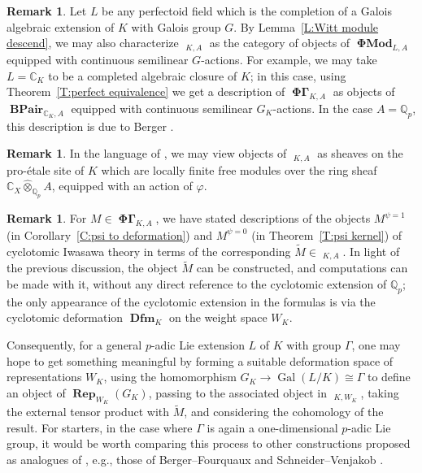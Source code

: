 \documentclass[12pt]{amsart}
\theoremstyle{definition}
\newtheorem{remark}[theorem]{Remark}
\numberwithin{equation}{theorem}
\newcommand{\CC}{\mathbb{C}}
\newcommand{\Qp}{\mathbb{Q}_p}
\newcommand{\QQ}{\mathbb{Q}}
\DeclareMathOperator{\BPair}{\mathbf{BPair}}
\DeclareMathOperator{\Dfm}{\mathbf{Dfm}}
\DeclareMathOperator{\Gal}{Gal}
\DeclareMathOperator{\PhiGamma}{\mathbf{\Phi \Gamma}}
\DeclareMathOperator{\PhiGammatilde}{\widetilde{\mathbf{\Phi \Gamma}}}
\DeclareMathOperator{\PhiMod}{\mathbf{\Phi Mod}}
\DeclareMathOperator{\Rep}{\mathbf{Rep}}
\begin{document}
\begin{remark} \label{R:general field}
Let $L$ be any perfectoid field which is the completion of a Galois algebraic extension of $K$ with Galois group $G$.
By Lemma~\ref{L:Witt module descend}, we may also characterize $\PhiGammatilde_{K,A}$ 
as the category of objects of $\PhiMod_{L,A}$ equipped with continuous semilinear $G$-actions. For example, we may take $L = \CC_K$ to be a completed algebraic closure of $K$;
in this case, using Theorem~\ref{T:perfect equivalence} we get a description of
$\PhiGamma_{K,A}$ as objects of $\BPair_{\CC_K,A}$ equipped with continuous semilinear $G_K$-actions. In the case $A = \QQ_p$, this description is due to Berger \cite{berger-b-pairs}.
\end{remark}

\begin{remark}
In the language of \cite{kedlaya-liu1}, we may view objects of $\PhiGammatilde_{K,A}$
as sheaves on the pro-\'etale site of $K$ which are locally finite free modules over the ring sheaf $\CC_X \widehat{\otimes}_{\Qp} A$, equipped with an action of $\varphi$.
\end{remark}

\begin{remark}
For $M \in \PhiGamma_{K,A}$, we have stated descriptions of the objects $M^{\psi=1}$ 
(in Corollary~\ref{C:psi to deformation})
and $M^{\psi=0}$
(in Theorem~\ref{T:psi kernel}) of cyclotomic Iwasawa theory
in terms of the corresponding $\tilde{M} \in \PhiGammatilde_{K,A}$.
In light of the previous discussion, the object $\tilde{M}$ can be constructed, and computations can be made with it, without any direct reference to the cyclotomic extension of $\QQ_p$; the only appearance of the cyclotomic extension in the formulas is via the cyclotomic deformation $\Dfm_K$ on the weight space $W_K$.

Consequently, for a general $p$-adic Lie extension $L$ of $K$ with group $\Gamma$,
one may hope to get something meaningful by forming a suitable deformation space of representations $W_K$, using the homomorphism $G_K \to \Gal(L/K) \cong \Gamma$ to define an object of $\Rep_{W_K}(G_K)$, passing to the associated object in $\PhiGammatilde_{K,W_K}$,
taking the external tensor product with $\tilde{M}$,
and considering the cohomology of the result. For starters, in the case where $\Gamma$ is again a one-dimensional $p$-adic Lie group, it would be worth comparing this process to other constructions proposed as analogues of \cite{berger-explicit}, e.g.,
those of Berger--Fourquaux \cite{berger-fourquaux} and Schneider--Venjakob
\cite{schneider-venjakob}.
\end{remark}
\end{document}
